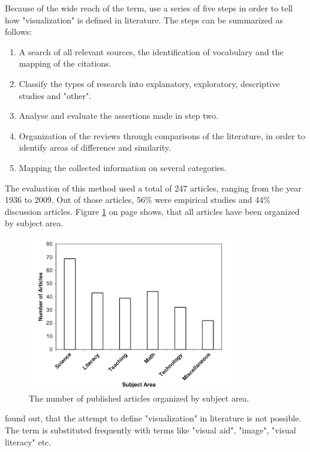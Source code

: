 Because of the wide reach of the term, \citeauthor{Phillips2010} use a series of five steps in order to tell how "visualization" is defined in literature. The steps can be summarized as follows:
\begin{enumerate}
\item A search of all relevant sources, the identification of vocabulary and the mapping of the citations.
\item Classify the types of research into explanatory, exploratory, descriptive studies and "other".
\item Analyse and evaluate the assertions made in step two.
\item Organization of the reviews through comparisons of the literature, in order to identify areas of difference and similarity.
\item Mapping the collected information on several categories.
\end{enumerate}
The evaluation of this method used a total of 247 articles, ranging from the year 1936 to 2009. Out of those articles, 56\% were empirical studies and 44\% discussion articles. Figure \ref{fig:evaluation-definition} on page \pageref{fig:evaluation-definition} shows, that all articles have been organized by subject area.

\begin{figure}[ht]
\centering
\includegraphics[width=0.8\textwidth,keepaspectratio]{images/definition/evaluation-definition.png}
\caption[
    The number of published articles organized by subject area .
]{The number of published articles organized by subject area.}
\label{fig:evaluation-definition}
\end{figure}

\citeauthor{Phillips2010} found out, that the attempt to define "visualization" in literature is not possible. The term is substituted frequently with terms like "visual aid", "image", "visual literacy" etc.


